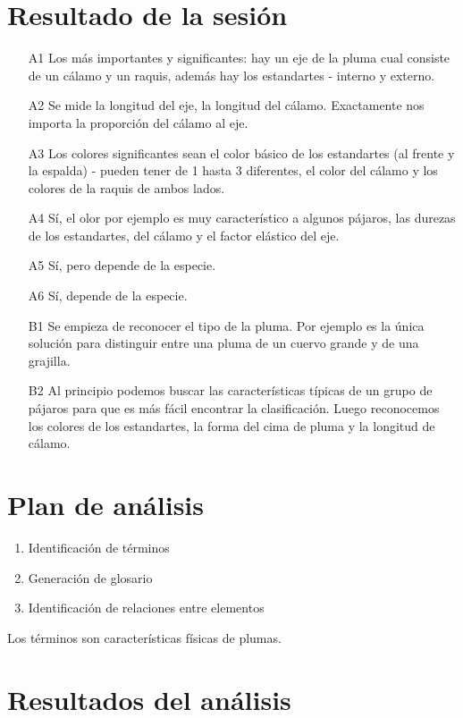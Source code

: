 \documentclass[a4paper,12pt]{article}
\begin{document}
\section{Resultado de la sesión}
\begin{itemize}
	\item[A1] Los más importantes y significantes: hay un eje de la pluma cual consiste de un cálamo y un raquis, además hay los estandartes - interno y externo.
	\item[A2] Se mide la longitud del eje, la longitud del cálamo. Exactamente nos importa la proporción del cálamo al eje.
	\item[A3] Los colores significantes sean el color básico de los estandartes (al frente y la espalda) - pueden tener de 1 hasta 3 diferentes, el color del cálamo y los colores de la raquis de ambos lados.
	\item[A4] Sí, el olor por ejemplo es muy característico a algunos pájaros, las durezas de los estandartes, del cálamo y el factor elástico del eje.
	\item[A5] Sí, pero depende de la especie.
	\item[A6] Sí, depende de la especie.
	\item[B1] Se empieza de reconocer el tipo de la pluma. Por ejemplo es la única solución para distinguir entre una pluma de un cuervo grande y de una grajilla.
	\item[B2] Al principio podemos buscar las características típicas de un grupo de pájaros para que es más fácil encontrar la clasificación. Luego reconocemos los colores de los estandartes, la forma del cima de pluma y la longitud de cálamo.
\end{itemize}

\section{Plan de análisis}
\begin{enumerate}
	\item Identificación de términos
	\item Generación de glosario
	\item Identificación de relaciones entre elementos
\end{enumerate}
Los términos son características físicas de plumas.

\section{Resultados del análisis}
\end{document}
